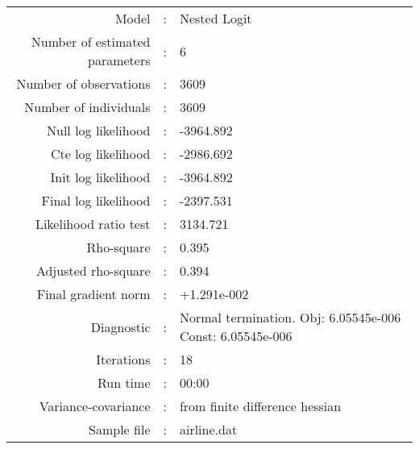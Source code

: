 

\begin{flushleft}
\begin{tabular}{rcl}
\hline
Model &:& Nested Logit\\
Number of estimated parameters&:&6\\
Number of  observations &:& 3609\\
Number of individuals&:&3609\\
Null log likelihood&:&-3964.892\\
Cte log likelihood&:&-2986.692\\
Init log likelihood&:&-3964.892\\
Final log likelihood&:&-2397.531\\
Likelihood ratio test &:&3134.721\\
Rho-square&:&0.395\\
Adjusted rho-square&:&0.394\\
Final gradient norm&:&+1.291e-002\\
Diagnostic&:&Normal termination. Obj: 6.05545e-006 Const: 6.05545e-006\\
Iterations&:&18\\
Run time&:&00:00\\
Variance-covariance&:&from finite difference hessian\\
Sample file&:&airline.dat\\
\end{tabular}
\end{flushleft}
